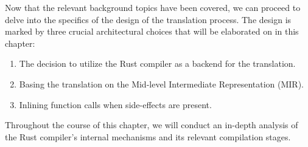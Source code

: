 \documentclass[../Thesis.tex]{subfiles}
\begin{document}
Now that the relevant background topics have been covered,
we can proceed to delve into the specifics of the design of the translation process.
The design is marked by three crucial architectural choices
that will be elaborated on in this chapter:

\begin{enumerate}
    \item The decision to utilize the Rust compiler as a backend for the translation.
    \item Basing the translation on the Mid-level Intermediate Representation (MIR).
    \item Inlining function calls when side-effects are present.
\end{enumerate}

Throughout the course of this chapter,
we will conduct an in-depth analysis
of the Rust compiler's internal mechanisms and its relevant compilation stages.
\end{document}

